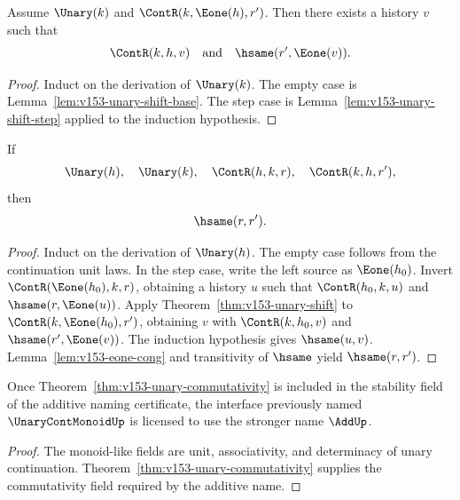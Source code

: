 \begin{theorem}
\label{thm:v153-unary-shift}
Assume \(\Unary(k)\) and \(\ContR(k,\Eone(h),r')\). Then there exists a history \(v\) such that
\[
  \ContR(k,h,v)
  \quad\text{and}\quad
  \hsame(r',\Eone(v)).
\]
\end{theorem}

\begin{proof}
Induct on the derivation of \(\Unary(k)\). The empty case is Lemma~\ref{lem:v153-unary-shift-base}. The step case is Lemma~\ref{lem:v153-unary-shift-step} applied to the induction hypothesis.
\end{proof}

\begin{theorem}
\label{thm:v153-unary-commutativity}
If
\[
  \Unary(h),\quad \Unary(k),\quad
  \ContR(h,k,r),\quad \ContR(k,h,r'),
\]
then
\[
  \hsame(r,r').
\]
\end{theorem}

\begin{proof}
Induct on the derivation of \(\Unary(h)\). The empty case follows from the continuation unit laws. In the step case, write the left source as \(\Eone(h_0)\). Invert \(\ContR(\Eone(h_0),k,r)\), obtaining a history \(u\) such that \(\ContR(h_0,k,u)\) and \(\hsame(r,\Eone(u))\). Apply Theorem~\ref{thm:v153-unary-shift} to \(\ContR(k,\Eone(h_0),r')\), obtaining \(v\) with \(\ContR(k,h_0,v)\) and \(\hsame(r',\Eone(v))\). The induction hypothesis gives \(\hsame(u,v)\). Lemma~\ref{lem:v153-eone-cong} and transitivity of \(\hsame\) yield \(\hsame(r,r')\).
\end{proof}

\begin{corollary}
\label{cor:v153-add-activation}
Once Theorem~\ref{thm:v153-unary-commutativity} is included in the stability field of the additive naming certificate, the interface previously named \(\UnaryContMonoidUp\) is licensed to use the stronger name \(\AddUp\).
\end{corollary}

\begin{proof}
The monoid-like fields are unit, associativity, and determinacy of unary continuation. Theorem~\ref{thm:v153-unary-commutativity} supplies the commutativity field required by the additive name.
\end{proof}
